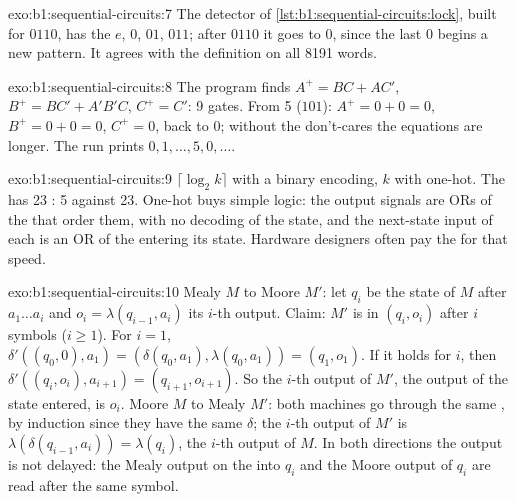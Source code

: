 \begin{solution}{exo:b1:sequential-circuits:7}
The detector of \cref{lst:b1:sequential-circuits:lock}, built for $0110$, has the  $e$, $0$, $01$, $011$; after
$0110$ it goes to $0$, since the last 0 begins a new pattern. It agrees with the definition on all 8191 words.
\end{solution}

\begin{solution}{exo:b1:sequential-circuits:8}
The program finds $A^+ = BC + AC'$, $B^+ = BC' + A'B'C$, $C^+ = C'$: 9 gates. From 5 ($101$): $A^+ = 0 + 0 = 0$, $B^+ = 0 + 0 =
0$, $C^+ = 0$, back to 0; without the don't-cares the equations are longer. The run prints $0, 1, \dots, 5, 0, \dots$.
\end{solution}

\begin{solution}{exo:b1:sequential-circuits:9}
$\lceil \log_2 k \rceil$ with a binary encoding, $k$ with one-hot. The  has 23 : 5  against 23.
One-hot buys simple logic: the output signals are ORs of the  that order them, with no decoding of the state, and
the next-state input of each  is an OR of the  entering its state. Hardware designers often pay the
 for that speed.
\end{solution}

\begin{solution}{exo:b1:sequential-circuits:10}
Mealy $M$ to Moore $M'$: let $q_i$ be the state of $M$ after $a_1 \dots a_i$ and $o_i = \lambda(q_{i-1}, a_i)$ its $i$-th
output. Claim: $M'$ is in $(q_i, o_i)$ after $i$ symbols ($i \geq 1$). For $i = 1$, $\delta'((q_0, 0), a_1) = (\delta(q_0,
a_1), \lambda(q_0, a_1)) = (q_1, o_1)$. If it holds for $i$, then $\delta'((q_i, o_i), a_{i+1}) = (q_{i+1}, o_{i+1})$. So the
$i$-th output of $M'$, the output of the state entered, is $o_i$. Moore $M$ to Mealy $M'$: both machines go through the
same , by induction since they have the same $\delta$; the $i$-th output of $M'$ is $\lambda(\delta(q_{i-1}, a_i)) =
\lambda(q_i)$, the $i$-th output of $M$. In both directions the output is not delayed: the Mealy output on the 
into $q_i$ and the Moore output of $q_i$ are read after the same symbol.
\end{solution}

